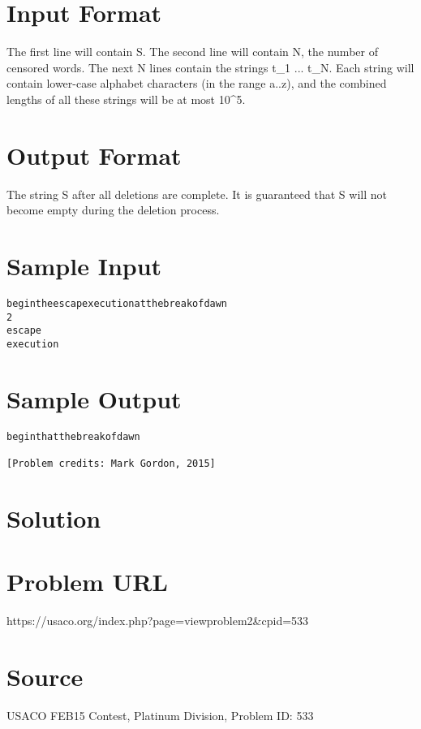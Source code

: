 \documentclass[12pt]{article}
\begin{document}
\section*{Input Format}
The first line will contain S.  
The second line will contain N, the number of censored words.  
The next N lines contain the strings t_1 ... t_N.  Each string will contain lower-case alphabet characters (in the range a..z), and the combined lengths of all these strings will be at most 10^5.

\section*{Output Format}
The string S after all deletions are complete.  It is guaranteed that S will not become empty during the deletion process.

\section*{Sample Input}
\begin{verbatim}
begintheescapexecutionatthebreakofdawn
2
escape
execution
\end{verbatim}

\section*{Sample Output}
\begin{verbatim}
beginthatthebreakofdawn

[Problem credits: Mark Gordon, 2015]
\end{verbatim}

\section*{Solution}


\section*{Problem URL}
https://usaco.org/index.php?page=viewproblem2&cpid=533

\section*{Source}
USACO FEB15 Contest, Platinum Division, Problem ID: 533
\end{document}
